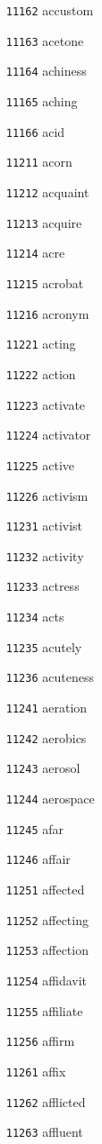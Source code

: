 \documentclass[twoside,11pt]{article}
\begin{document}
\begin{multicols}{5}
\begin{enumerate}
\item[\texttt{11162}] accustom
\item[\texttt{11163}] acetone
\item[\texttt{11164}] achiness
\item[\texttt{11165}] aching
\item[\texttt{11166}] acid
\item[\texttt{11211}] acorn
\item[\texttt{11212}] acquaint
\item[\texttt{11213}] acquire
\item[\texttt{11214}] acre
\item[\texttt{11215}] acrobat
\item[\texttt{11216}] acronym
\item[\texttt{11221}] acting
\item[\texttt{11222}] action
\item[\texttt{11223}] activate
\item[\texttt{11224}] activator
\item[\texttt{11225}] active
\item[\texttt{11226}] activism
\item[\texttt{11231}] activist
\item[\texttt{11232}] activity
\item[\texttt{11233}] actress
\item[\texttt{11234}] acts
\item[\texttt{11235}] acutely
\item[\texttt{11236}] acuteness
\item[\texttt{11241}] aeration
\item[\texttt{11242}] aerobics
\item[\texttt{11243}] aerosol
\item[\texttt{11244}] aerospace
\item[\texttt{11245}] afar
\item[\texttt{11246}] affair
\item[\texttt{11251}] affected
\item[\texttt{11252}] affecting
\item[\texttt{11253}] affection
\item[\texttt{11254}] affidavit
\item[\texttt{11255}] affiliate
\item[\texttt{11256}] affirm
\item[\texttt{11261}] affix
\item[\texttt{11262}] afflicted
\item[\texttt{11263}] affluent

\end{enumerate}
\end{multicols}
\end{document}
